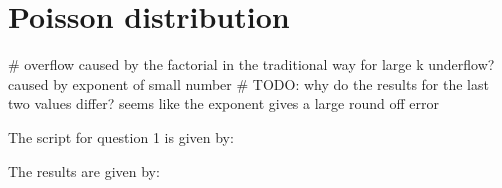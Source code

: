 \section{Poisson distribution}

# overflow caused by the factorial in the traditional way for large k
underflow? caused by exponent of small number
# TODO: why do the results for the last two values differ? seems like the exponent gives a large round off error

The script for question 1 is given by:


The results are given by:

